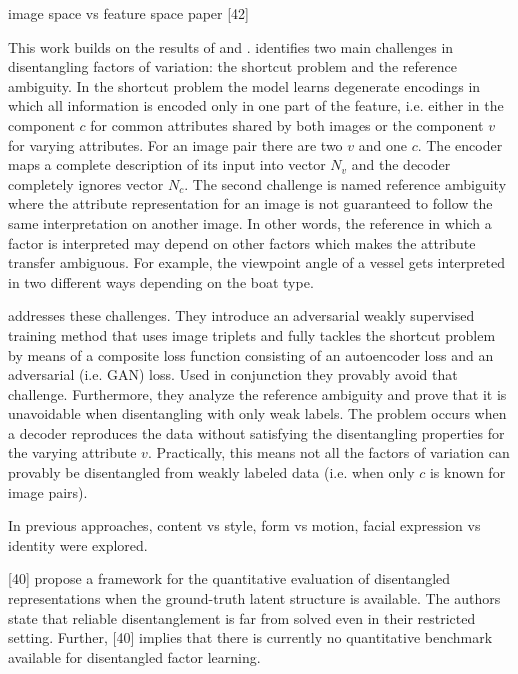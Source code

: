 \documentclass[12pt,a4paper]{article}
\begin{document}
\par image space vs feature space paper [42]

This work builds on the results of \cite{1711.07410} and \cite{1711.02245}.
\cite{1711.02245} identifies two main challenges in disentangling factors of variation: the shortcut problem and the reference ambiguity. In the shortcut problem the model learns degenerate encodings in which all information is encoded only in one part of the feature, i.e. either in the component $c$ for common attributes shared by both images or the component $v$ for varying attributes. For an image pair there are two $v$ and one $c$. The encoder maps a complete description of its input into vector $N_v$ and the decoder completely ignores vector $N_c$.
\newline The second challenge is named reference ambiguity where the attribute representation for an image is not guaranteed to follow the same interpretation on another image. In other words, the reference in which a factor is interpreted may depend on other factors which makes the attribute transfer ambiguous. For example, the viewpoint angle of a vessel gets interpreted in two different ways depending on the boat type.
\par[Understanding Degeneracies and Ambiguities in Attribute Transfer] addresses these challenges. They introduce an adversarial weakly supervised training method that uses image triplets and fully tackles the shortcut problem by means of a composite loss function consisting of an autoencoder loss and an adversarial (i.e. GAN) loss. Used in conjunction they provably avoid that challenge. 
Furthermore, they analyze the reference ambiguity and prove that it is unavoidable when disentangling with only weak labels. The problem occurs when a decoder reproduces the data without satisfying the disentangling properties for the varying attribute $v$. Practically, this means not all the factors of variation can provably be disentangled from weakly labeled data (i.e. when only $c$ is known for image pairs).    

In previous approaches, content vs style, form vs motion, facial expression vs identity were explored.

[40] propose a framework for the quantitative evaluation of disentangled representations when the ground-truth latent structure is available. The authors state that reliable disentanglement is far from solved even in their restricted setting. Further, [40] implies that there is currently no quantitative benchmark available for disentangled factor learning.
\end{document}
